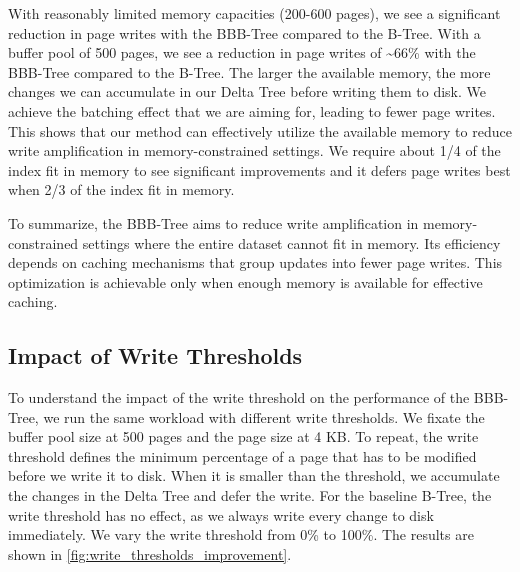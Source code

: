 With reasonably limited memory capacities (200-600 pages), we see a significant reduction in page writes with the BBB-Tree compared to the B-Tree.
With a buffer pool of 500 pages, we see a reduction in page writes of \textasciitilde66\% with the BBB-Tree compared to the B-Tree.
The larger the available memory, the more changes we can accumulate in our Delta Tree before writing them to disk.
We achieve the batching effect that we are aiming for, leading to fewer page writes.
This shows that our method can effectively utilize the available memory to reduce write amplification in memory-constrained settings.
We require about 1/4 of the index fit in memory to see significant improvements and it defers page writes best when 2/3 of the index fit in memory.

To summarize, the BBB-Tree aims to reduce write amplification in memory-constrained settings where the entire dataset cannot fit in memory.
Its efficiency depends on caching mechanisms that group updates into fewer page writes. 
This optimization is achievable only when enough memory is available for effective caching.

\subsection*{Impact of Write Thresholds}
To understand the impact of the write threshold on the performance of the BBB-Tree, we run the same workload with different write thresholds.
We fixate the buffer pool size at 500 pages and the page size at 4 KB.
To repeat, the write threshold defines the minimum percentage of a page that has to be modified before we write it to disk.
When it is smaller than the threshold, we accumulate the changes in the Delta Tree and defer the write.
For the baseline B-Tree, the write threshold has no effect, as we always write every change to disk immediately.
We vary the write threshold from 0\% to 100\%.
The results are shown in \autoref{fig:write_thresholds_improvement}.

